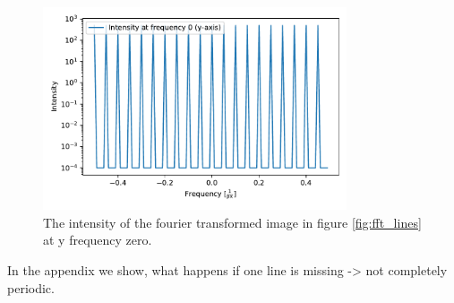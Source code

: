 \begin{figure}[H]
	\centering
		\includegraphics[width=0.8\textwidth]{pics/fft_simulation_cutmorelines.pdf}
		\caption{The intensity of the fourier transformed image in figure \ref{fig:fft_lines} at y frequency zero.}
		\label{fig:fft_lines_cut}
\end{figure}

In the appendix we show, what happens if one line is missing -> not completely periodic.